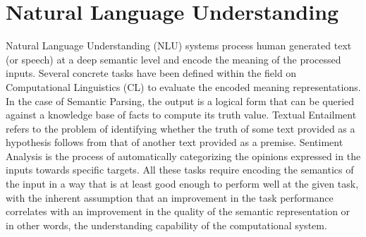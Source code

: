 \section{Natural Language Understanding}
Natural Language Understanding (NLU) systems process human generated text (or speech) at a deep semantic level and encode the meaning
of the processed inputs. Several concrete tasks have been defined within the field on Computational Linguistics (CL) to evaluate the encoded meaning representations.
In the case of Semantic Parsing, the output is a logical form that can be queried against a knowledge base of facts to compute its truth value. Textual Entailment refers to the 
problem of identifying whether the truth of some text provided as a hypothesis follows from that of another text provided as a premise. Sentiment Analysis is the process of 
automatically categorizing the opinions expressed in the inputs towards specific targets. All these tasks require encoding the semantics of the input in a way that is
at least good enough to perform well at the given task, with the inherent assumption that an improvement in the task performance correlates with an improvement in the
quality of the semantic representation or in other words, the understanding capability of the computational system.

